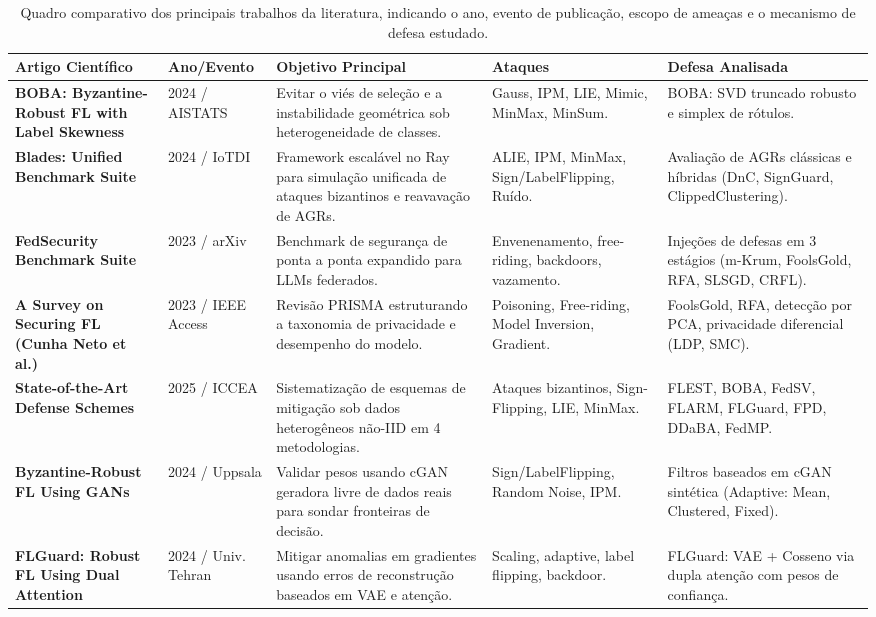 \documentclass[11pt,a4paper]{article}
\begin{document}
\begin{table}[htbp]
\centering
\caption{Quadro comparativo dos principais trabalhos da literatura, indicando o ano, evento de publicação, escopo de ameaças e o mecanismo de defesa estudado.}
\label{tab:artigos}
\fontsize{7.5}{10}\selectfont
\begin{tabular}{p{3.8cm}p{1.2cm}p{5.5cm}p{2.8cm}p{3.2cm}}
\toprule
\textbf{Artigo Científico} & \textbf{Ano/Evento} & \textbf{Objetivo Principal} & \textbf{Ataques} & \textbf{Defesa Analisada} \\
\midrule
\rowcolor{lightbg} \textbf{BOBA: Byzantine-Robust FL with Label Skewness} & 2024 / AISTATS & Evitar o viés de seleção e a instabilidade geométrica sob heterogeneidade de classes. & Gauss, IPM, LIE, Mimic, MinMax, MinSum. & BOBA: SVD truncado robusto e simplex de rótulos. \\
\textbf{Blades: Unified Benchmark Suite} & 2024 / IoTDI & Framework escalável no Ray para simulação unificada de ataques bizantinos e reavavação de AGRs. & ALIE, IPM, MinMax, Sign/LabelFlipping, Ruído. & Avaliação de AGRs clássicas e híbridas (DnC, SignGuard, ClippedClustering). \\
\rowcolor{lightbg} \textbf{FedSecurity Benchmark Suite} & 2023 / arXiv & Benchmark de segurança de ponta a ponta expandido para LLMs federados. & Envenenamento, free-riding, backdoors, vazamento. & Injeções de defesas em 3 estágios (m-Krum, FoolsGold, RFA, SLSGD, CRFL). \\
\textbf{A Survey on Securing FL (Cunha Neto et al.)} & 2023 / IEEE Access & Revisão PRISMA estruturando a taxonomia de privacidade e desempenho do modelo. & Poisoning, Free-riding, Model Inversion, Gradient. & FoolsGold, RFA, detecção por PCA, privacidade diferencial (LDP, SMC). \\
\rowcolor{lightbg} \textbf{State-of-the-Art Defense Schemes} & 2025 / ICCEA & Sistematização de esquemas de mitigação sob dados heterogêneos não-IID em 4 metodologias. & Ataques bizantinos, Sign-Flipping, LIE, MinMax. & FLEST, BOBA, FedSV, FLARM, FLGuard, FPD, DDaBA, FedMP. \\
\textbf{Byzantine-Robust FL Using GANs} & 2024 / Uppsala & Validar pesos usando cGAN geradora livre de dados reais para sondar fronteiras de decisão. & Sign/LabelFlipping, Random Noise, IPM. & Filtros baseados em cGAN sintética (Adaptive: Mean, Clustered, Fixed). \\
\rowcolor{lightbg} \textbf{FLGuard: Robust FL Using Dual Attention} & 2024 / Univ. Tehran & Mitigar anomalias em gradientes usando erros de reconstrução baseados em VAE e atenção. & Scaling, adaptive, label flipping, backdoor. & FLGuard: VAE + Cosseno via dupla atenção com pesos de confiança. \\

\end{tabular}
\end{table}
\end{document}
